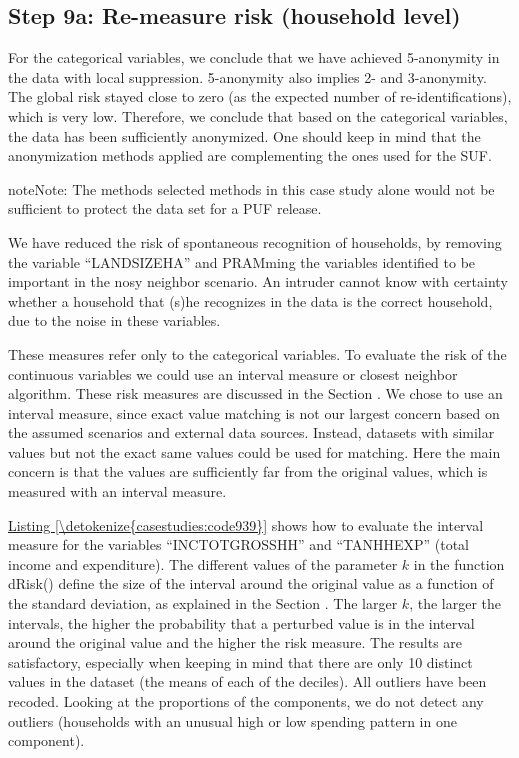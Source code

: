 \documentclass[letterpaper,10pt,english]{sphinxmanual}
\begin{document}
\subsection{Step 9a: Re-measure risk (household level)}
\label{\detokenize{casestudies:step-9a-re-measure-risk-household-level}}
For the categorical variables, we conclude that we have achieved
5-anonymity in the data with local suppression. 5-anonymity also implies
2- and 3-anonymity. The global risk stayed close to zero (as the
expected number of re-identifications), which is very low. Therefore, we
conclude that based on the categorical variables, the data has been
sufficiently anonymized. One should keep in mind that the anonymization
methods applied are complementing the ones used for the SUF.

\begin{sphinxadmonition}{note}{Note:}
The methods selected methods in this case study alone would not be
sufficient to protect the data set for a PUF release.
\end{sphinxadmonition}

We have reduced the risk of spontaneous recognition of households, by
removing the variable “LANDSIZEHA” and PRAMming the variables identified
to be important in the nosy neighbor scenario. An intruder cannot know
with certainty whether a household that (s)he recognizes in the data is
the correct household, due to the noise in these variables.

These measures refer only to the categorical variables. To evaluate the
risk of the continuous variables we could use an interval measure or
closest neighbor algorithm. These risk measures are discussed in the Section
.
We chose to use an interval measure, since exact value matching is
not our largest concern based on the assumed scenarios and external data
sources. Instead, datasets with similar values but not the exact same
values could be used for matching. Here the main concern is that the
values are sufficiently far from the original values, which is measured
with an interval measure.

\hyperref[\detokenize{casestudies:code939}]{Listing \ref{\detokenize{casestudies:code939}}} shows how to evaluate the interval measure for the
variables “INCTOTGROSSHH” and “TANHHEXP” (total income and expenditure).
The different values of the parameter \(k\) in the function dRisk()
define the size of the interval around the original value as a function
of the standard deviation, as explained in the Section
 . The larger
\(k\), the larger the intervals, the higher the probability that a
perturbed value is in the interval around the original value and the
higher the risk measure. The results are satisfactory, especially when
keeping in mind that there are only 10 distinct values in the dataset
(the means of each of the deciles). All outliers have been recoded.
Looking at the proportions of the components, we do not detect any
outliers (households with an unusual high or low spending pattern in one
component).
\end{document}
